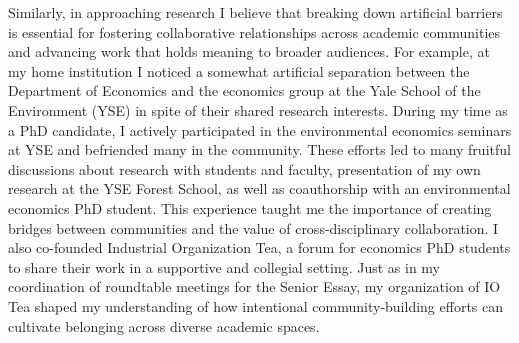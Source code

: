\documentclass[11pt,letterpaper]{article}
\begin{document}
Similarly, in approaching research I believe that breaking down artificial barriers is essential for fostering collaborative relationships across academic communities and advancing work that holds meaning to broader audiences. For example, at my home institution I noticed a somewhat artificial separation between the Department of Economics and the economics group at the Yale School of the Environment (YSE) in spite of their shared research interests. During my time as a PhD candidate, I actively participated in the environmental economics seminars at YSE and befriended many in the community. These efforts led to many fruitful discussions about research with students and faculty, presentation of my own research at the YSE Forest School, as well as coauthorship with an environmental economics PhD student. This experience taught me the importance of creating bridges between communities and the value of cross-disciplinary collaboration. I also co-founded Industrial Organization Tea, a forum for economics PhD students to share their work in a supportive and collegial setting. Just as in my coordination of roundtable meetings for the Senior Essay, my organization of IO Tea shaped my understanding of how intentional community-building efforts can cultivate belonging across diverse academic spaces.
\end{document}
